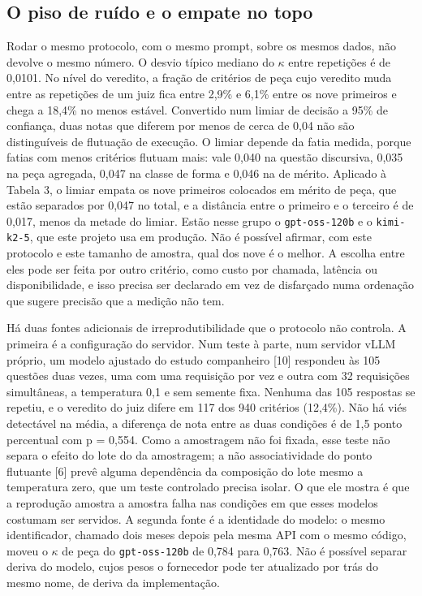 \documentclass{IOS-Book-Article}
\begin{document}
\subsection{O piso de ruído e o empate no topo}

Rodar o mesmo protocolo, com o mesmo prompt, sobre os mesmos dados, não devolve o mesmo número. O desvio típico mediano do $\kappa$ entre repetições é de 0,0101. No nível do veredito, a fração de critérios de peça cujo veredito muda entre as repetições de um juiz fica entre 2,9\% e 6,1\% entre os nove primeiros e chega a 18,4\% no menos estável. Convertido num limiar de decisão a 95\% de confiança, duas notas que diferem por menos de cerca de 0,04 não são distinguíveis de flutuação de execução. O limiar depende da fatia medida, porque fatias com menos critérios flutuam mais: vale 0,040 na questão discursiva, 0,035 na peça agregada, 0,047 na classe de forma e 0,046 na de mérito. Aplicado à Tabela 3, o limiar empata os nove primeiros colocados em mérito de peça, que estão separados por 0,047 no total, e a distância entre o primeiro e o terceiro é de 0,017, menos da metade do limiar. Estão nesse grupo o \texttt{gpt-oss-120b} e o \texttt{kimi-k2-5}, que este projeto usa em produção. Não é possível afirmar, com este protocolo e este tamanho de amostra, qual dos nove é o melhor. A escolha entre eles pode ser feita por outro critério, como custo por chamada, latência ou disponibilidade, e isso precisa ser declarado em vez de disfarçado numa ordenação que sugere precisão que a medição não tem.

Há duas fontes adicionais de irreprodutibilidade que o protocolo não controla. A primeira é a configuração do servidor. Num teste à parte, num servidor vLLM próprio, um modelo ajustado do estudo companheiro [10] respondeu às 105 questões duas vezes, uma com uma requisição por vez e outra com 32 requisições simultâneas, a temperatura 0,1 e sem semente fixa. Nenhuma das 105 respostas se repetiu, e o veredito do juiz difere em 117 dos 940 critérios (12,4\%). Não há viés detectável na média, a diferença de nota entre as duas condições é de 1,5 ponto percentual com p = 0,554. Como a amostragem não foi fixada, esse teste não separa o efeito do lote do da amostragem; a não associatividade do ponto flutuante [6] prevê alguma dependência da composição do lote mesmo a temperatura zero, que um teste controlado precisa isolar. O que ele mostra é que a reprodução amostra a amostra falha nas condições em que esses modelos costumam ser servidos. A segunda fonte é a identidade do modelo: o mesmo identificador, chamado dois meses depois pela mesma API com o mesmo código, moveu o $\kappa$ de peça do \texttt{gpt-oss-120b} de 0,784 para 0,763. Não é possível separar deriva do modelo, cujos pesos o fornecedor pode ter atualizado por trás do mesmo nome, de deriva da implementação.
\end{document}
